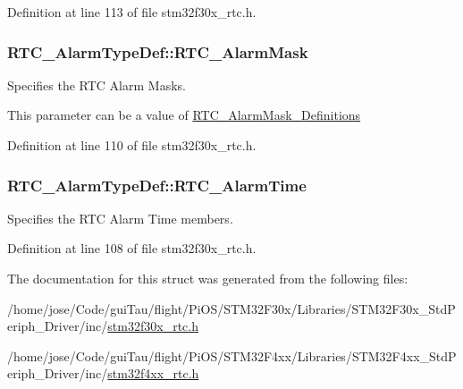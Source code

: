 Definition at line 113 of file stm32f30x\-\_\-rtc.\-h.

\hypertarget{struct_r_t_c___alarm_type_def_a8a646c3b686c845c689900285b7c272e}{
\subsubsection[{R\-T\-C\-\_\-\-Alarm\-Mask}]{ R\-T\-C\-\_\-\-Alarm\-Type\-Def\-::\-R\-T\-C\-\_\-\-Alarm\-Mask}}\label{struct_r_t_c___alarm_type_def_a8a646c3b686c845c689900285b7c272e}
\begin{DoxyVerb}                 Specifies the RTC Alarm Masks.
\end{DoxyVerb}
 This parameter can be a value of \hyperlink{group___r_t_c___alarm_mask___definitions}{R\-T\-C\-\_\-\-Alarm\-Mask\-\_\-\-Definitions} 

Definition at line 110 of file stm32f30x\-\_\-rtc.\-h.

\hypertarget{struct_r_t_c___alarm_type_def_a4f54e02d1953bac8e352731344d5a260}{
\subsubsection[{R\-T\-C\-\_\-\-Alarm\-Time}]{ R\-T\-C\-\_\-\-Alarm\-Type\-Def\-::\-R\-T\-C\-\_\-\-Alarm\-Time}}\label{struct_r_t_c___alarm_type_def_a4f54e02d1953bac8e352731344d5a260}
Specifies the R\-T\-C Alarm Time members. 

Definition at line 108 of file stm32f30x\-\_\-rtc.\-h.



The documentation for this struct was generated from the following files\-:\begin{DoxyCompactItemize}
\item 
/home/jose/\-Code/gui\-Tau/flight/\-Pi\-O\-S/\-S\-T\-M32\-F30x/\-Libraries/\-S\-T\-M32\-F30x\-\_\-\-Std\-Periph\-\_\-\-Driver/inc/\hyperlink{stm32f30x__rtc_8h}{stm32f30x\-\_\-rtc.\-h}\item 
/home/jose/\-Code/gui\-Tau/flight/\-Pi\-O\-S/\-S\-T\-M32\-F4xx/\-Libraries/\-S\-T\-M32\-F4xx\-\_\-\-Std\-Periph\-\_\-\-Driver/inc/\hyperlink{stm32f4xx__rtc_8h}{stm32f4xx\-\_\-rtc.\-h}\end{DoxyCompactItemize}
